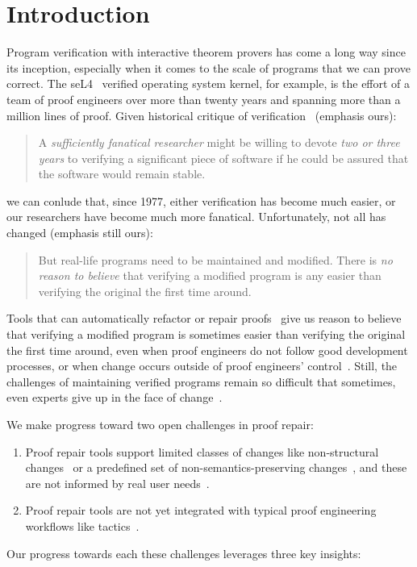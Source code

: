 \section{Introduction}

Program verification with interactive theorem provers has come a long way since its inception,
especially when it comes to the scale of programs that we can prove correct.
The seL4~\cite{Klein2009} verified operating system kernel, for example,
is the effort of a team of proof engineers over more than twenty years and spanning more than
a million lines of proof.
Given historical critique of verification~\cite{DeMillo1977} (emphasis ours):

\begin{quote}
A \textit{sufficiently fanatical researcher}
might be willing to devote \textit{two or 
three years} to verifying a significant 
piece of software if he could be 
assured that the software would remain stable.
\end{quote}
we can conlude that, since 1977, either verification has become much easier,
or our researchers have become much more fanatical. Unfortunately, not all has changed (emphasis still ours):

\begin{quote}
But real-life programs need to 
be maintained and modified. 
There is \textit{no reason to believe} that verifying a modified program is any 
easier than verifying the original the 
first time around.
\end{quote}
Tools that can automatically refactor or repair proofs~\cite{wibergh2019, WhitesidePhD, Dietrich2013, adams2015, Bourke12, Roe2016, robert2018, pumpkinpatch}
give us reason to believe that verifying a modified program is sometimes easier than verifying the original the first time
around, even when proof engineers do not follow good development processes,
or when change occurs outside of proof engineers' control~\cite{PGL-045}.
Still, the challenges of maintaining verified programs remain so difficult that
sometimes, even experts give up in the face of change~\cite{replica}.

We make progress toward two open challenges in proof repair:

\begin{enumerate}
\item Proof repair tools support limited classes of changes like non-structural changes~\cite{pumpkinpatch} or a predefined set
of non-semantics-preserving changes~\cite{robert2018, wibergh2019}, and these are not informed by real user needs~\cite{replica}.
\item Proof repair tools are not yet integrated with typical proof engineering workflows like tactics~\cite{PGL-045, pumpkinpatch, robert2018}.
\end{enumerate}
Our progress towards each these challenges leverages three key insights: %

